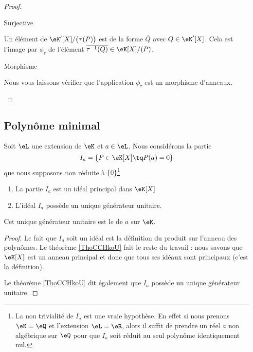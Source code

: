 \begin{proof}
\begin{subproof}
        \item[Surjective]

            Un élément de \( \eK'[X]/\big( \tau(P) \big)\) est de la forme \( \bar Q\) avec \( Q\in \eK'[X]\). Cela est l'image par \( \phi_{\tau}\) de l'élément \( \overline{ \tau^{-1}(Q) }\in \eK[X]/(P)\).

        \item[Morphisme]

            Nous vous laissons vérifier que l'application \( \phi_{\tau}\) est un morphisme d'anneaux.

    \end{subproof}
\end{proof}

\subsection{Polynôme minimal}

\begin{lemmaDef}    \label{DefCVMooFGSAgL}
    Soit \( \eL\) une extension de \( \eK\) et \( a\in \eL\). Nous considérons la partie
    \begin{equation}
        I_a=\{ P\in \eK[X]\tq P(a)=0 \}
    \end{equation}
    que nous supposons non réduite à \( \{ 0 \}\)\footnote{La non trivialité de \( I_a\) est une vraie hypothèse. En effet si nous prenons \( \eK=\eQ\) et l'extension \( \eL=\eR\), alors il suffit de prendre un réel \( a\) non algébrique sur \( \eQ\) pour que \( I_a\) soit réduit au seul polynôme identiquement nul.}

    \begin{enumerate}
        \item
            La partie \( I_a\) est un idéal principal dans \( \eK[X]\)
        \item
            L'idéal \( I_a\) possède un unique générateur unitaire.
    \end{enumerate}

    Cet unique générateur unitaire est le  de \( a\) sur \( \eK\).
\end{lemmaDef}

\begin{proof}
    Le fait que \( I_a\) soit un idéal est la définition du produit sur l'anneau des polynômes. Le théorème \ref{ThoCCHkoU} fait le reste du travail : nous savons que \( \eK[X]\) est un anneau principal et donc que tous ses idéaux sont principaux (c'est la définition).
   
    Le théorème \ref{ThoCCHkoU} dit également que \( I_a\) possède un unique générateur unitaire.
\end{proof}


